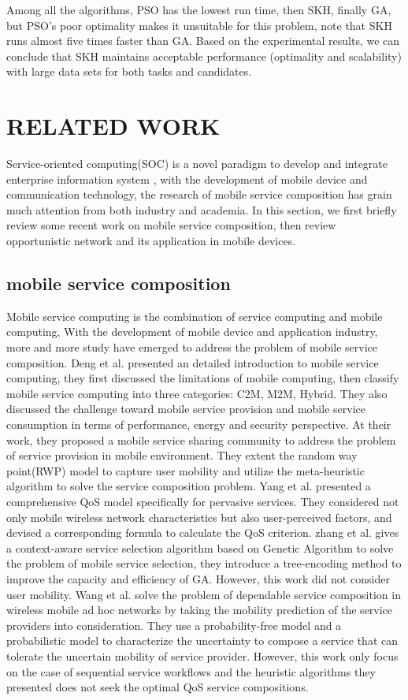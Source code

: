 \documentclass[10pt,journal,compsoc]{IEEEtran}
\begin{document}
Among all the algorithms, PSO has the lowest run time, then SKH, finally GA, but PSO's poor optimality makes it unsuitable for this problem, note that SKH runs almost five times faster than GA. Based on the experimental results, we can conclude that SKH maintains acceptable performance (optimality and scalability) with large data sets for both tasks and candidates.

\section{RELATED WORK}
Service-oriented computing(SOC) is a novel paradigm to develop and integrate enterprise information system \cite{}, with the development of mobile device and communication technology, the research of mobile service composition has grain much attention from both industry and academia. In this section, we first briefly review some recent work on mobile service composition, then review opportunistic network and its application in mobile devices.

\subsection{mobile service composition}
Mobile service computing is the combination of service computing and mobile computing, With the development of mobile device and application industry, more and more study have emerged to address the problem of mobile service composition. 
Deng et al. \cite{Deng2016} presented an detailed introduction to mobile service computing, they first discussed the limitations of mobile computing, then classify mobile service computing into three categories: C2M, M2M, Hybrid. They also discussed the challenge toward mobile service provision and mobile service consumption in terms of performance, energy and security perspective. At their \cite{Deng2017} work, they proposed a mobile service sharing community to address the problem of service provision in mobile environment. They extent the random way point(RWP) model to capture user mobility and utilize the meta-heuristic algorithm to solve the service composition problem. Yang et al. \cite{Yang2010} presented a comprehensive QoS model specifically for pervasive services. They considered not only mobile wireless network characteristics but also user-perceived factors, and devised a corresponding formula to calculate the QoS criterion. 
zhang et al. \cite{Zhang2016} gives a context-aware service selection algorithm based on Genetic Algorithm to solve the problem of mobile service selection, they introduce a tree-encoding method to improve the capacity and efficiency of GA. However, this work did not consider user mobility.
Wang et al. \cite{wang2011exploiting} solve the problem of dependable service composition in wireless mobile ad hoc networks by taking the mobility prediction of the service providers into consideration.
They use a probability-free model and a probabilistic model to characterize the uncertainty to compose a service that can tolerate the uncertain mobility of service provider. However, this work only focus on the case of sequential service workflows and the heuristic algorithms they presented does not seek the optimal QoS service compositions.
\end{document}
